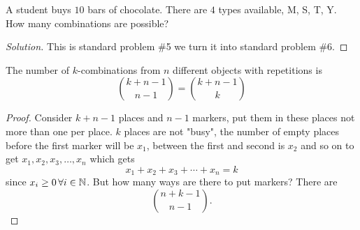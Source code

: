 \documentclass[10pt, a4paper]{article}
\begin{document}
\begin{example}
    A student buys $10$ bars of chocolate.
    There are $4$ types available,
    M, S, T, Y.
    How many combinations are possible?
    \begin{proof}[Solution]\renewcommand{\qedsymbol}{}
        This is standard problem \#5 we turn it into standard problem \#6.
    \end{proof}
\end{example}

\begin{theorem}\label{disc_thm_diffobjrep}
    The number of $k$-combinations from $n$ different objects with repetitions is
    \[
    \binom{k + n - 1}{n - 1} = \binom{k + n - 1}{k}
    \]
    \begin{proof}
        Consider $k + n - 1$ places and $n - 1$ markers,
        put them in these places not more than one per place.
        $k$ places are not "busy",
        the number of empty places before the first marker will be $x_1$,
        between the first and second is $x_2$ and so on to get
        $x_1, x_2, x_3, \dotsc, x_n$ which gets
        \[
        x_1 + x_2 + x_3 + \dotsi + x_n = k
        \]
        since $x_i \geq 0\, \forall i \in \mathbb{N}$.
        But how many ways are there to put markers?
        There are
        \[
        \binom{n + k - 1}{n - 1}.
        \]
    \end{proof}
\end{theorem}
\end{document}
